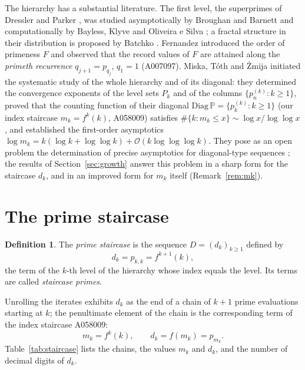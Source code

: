 \documentclass[11pt,a4paper]{article}
\theoremstyle{plain}
\theoremstyle{definition}
\newtheorem{definition}[theorem]{Definition}
\newcommand{\Pset}{\mathbb{P}}
\begin{document}
The hierarchy has a substantial literature. The first level, the superprimes
of Dressler and Parker \cite{DresslerParker}, was studied asymptotically by
Broughan and Barnett \cite{BroughanBarnett} and computationally by Bayless,
Klyve and Oliveira e Silva \cite{Bayless}; a fractal structure in their
distribution is proposed by Batchko \cite{Batchko}. Fernandez
\cite{Fernandez} introduced the order of primeness $F$ and observed that the
record values of $F$ are attained along the \emph{primeth recurrence}
$q_{j+1}=p_{q_j}$, $q_1=1$ (A007097). Miska, T\'oth and \.Zmija
\cite{MiskaTothZmija} initiated the systematic study of the whole hierarchy
and of its diagonal: they determined the convergence exponents of the level
sets $P_k$ and of the columns $\{p^{(k)}_n:k\ge1\}$, proved that the counting
function of their diagonal $\mathrm{Diag}\,\Pset=\{p^{(k)}_k:k\ge1\}$ (our
index staircase $m_k=f^{k}(k)$, A058009) satisfies
$\#\{k: m_k\le x\}\sim \log x/\log\log x$, and established the first-order
asymptotics $\log m_k=k(\log k+\log\log k)+\mathcal{O}(k\log\log\log k)$.
They pose as an open problem the determination of precise asymptotics for
diagonal-type sequences \cite[Problem~1]{MiskaTothZmija}; the results of
Section~\ref{sec:growth} answer this problem in a sharp form for the
staircase $d_k$, and in an improved form for $m_k$ itself
(Remark~\ref{rem:mk}).

\section{The prime staircase}\label{sec:staircase}

\begin{definition}\label{def:staircase}
The \emph{prime staircase} is the sequence $D=(d_k)_{k\ge1}$ defined by
\[
  d_k=p_{k,k}=f^{k+1}(k),
\]
the term of the $k$-th level of the hierarchy whose index equals the level.
Its terms are called \emph{staircase primes}.
\end{definition}

Unrolling the iterates exhibits $d_k$ as the end of a chain of $k+1$ prime
evaluations starting at $k$; the penultimate element of the chain is the
corresponding term of the index staircase A058009:
\[
  m_k=f^{k}(k),\qquad d_k=f(m_k)=p_{m_k}.
\]
Table~\ref{tab:staircase} lists the chains, the values $m_k$ and $d_k$, and
the number of decimal digits of $d_k$.
\end{document}

